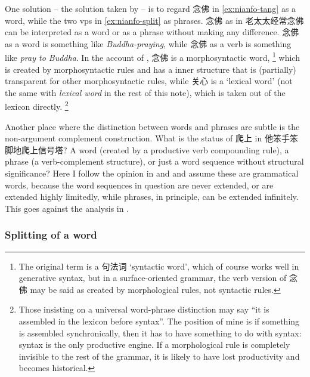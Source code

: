 \documentclass[UTF8, a4paper, oneside, scheme=plain]{ctexart}
\newcommand*{\citesec}[1]{\S~{#1}}
\newcommand*{\citepage}[1]{pp.~{#1}}
\newcommand*{\term}[1]{\emph{#1}}
\newcommand{\corpus}[1]{\emph{#1}}
\newcommand{\translate}[1]{`#1'}
\begin{document}
One solution -- the solution taken by \citet[\citesec{1.2.6}]{zhudexigrammar} -- 
is to regard 念佛 in \eqref{ex:nianfo-tang} as a word,
while the two \acs{vp}s in \eqref{ex:nianfo-split} as phrases.
念佛 as in 老太太经常念佛 can be interpreted as a word or as a phrase
without making any difference.
念佛 as a word is something like \corpus{Buddha-praying},
while 念佛 as a verb is something like \corpus{pray to Buddha}.
In the account of \citet[\citepage{82}]{feng2000},
念佛 is a morphosyntactic word,%
\footnote{
    The original term is a 句法词 \translate{syntactic word},
    which of course works well in generative syntax,
    but in a surface-oriented grammar,
    the verb version of 念佛 may be said as created by morphological rules,
    not syntactic rules.
}
which is created by morphosyntactic rules 
and has a inner structure that is (partially) transparent 
for other morphosyntactic rules,
while 关心 is a \translate{lexical word} 
(not the same with \term{lexical word} in the rest of this note),
which is taken out of the lexicon directly.%
\footnote{
    Those insisting on a universal word-phrase distinction 
    may say ``it is assembled in the lexicon before syntax''.
    The position of mine is if something is assembled synchronically,
    then it has to have something to do with syntax:
    syntax is the only productive engine.
    If a morphological rule is completely invisible to the rest of the grammar,
    it is likely to have lost productivity and becomes historical.
}

Another place where the distinction between words and phrases are subtle is 
the non-argument complement construction.
What is the status of 爬上 in 他笨手笨脚地爬上信号塔?
A word (created by a productive verb compounding rule), 
a phrase (a verb-complement structure),
or just a word sequence without structural significance?
Here I follow the opinion in \citep[\citepage{86}]{feng2000} and \citep{tham2015resultative}
and assume these are grammatical words,
because the word sequences in question are never extended,
or are extended highly limitedly,
while phrases, in principle, can be extended infinitely.
This goes against the analysis in \citep[\citesec{1.2.7}]{zhudexigrammar}.

\subsubsection{Splitting of a word}\label{sec:splitting}
\end{document}
